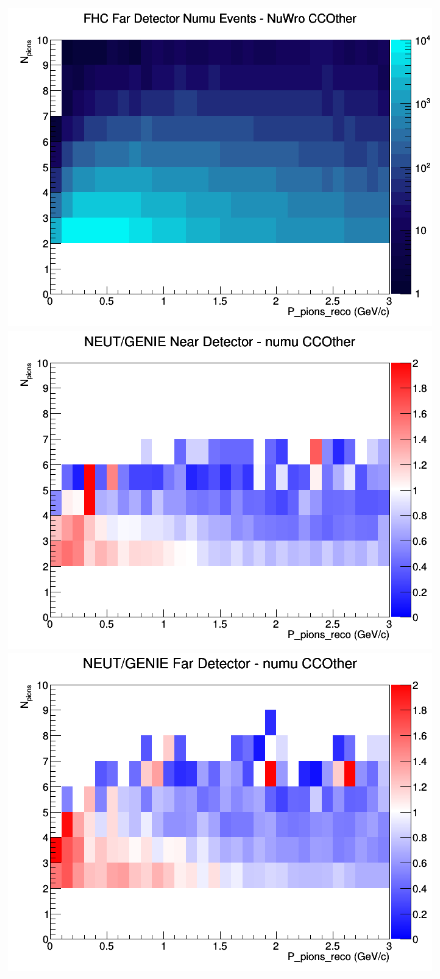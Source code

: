 \documentclass[12pt]{article}
\begin{document}
\begin{figure}[h]
\endminipage
{}
\includegraphics[width=\linewidth]{eff_N_P/FGT/pions/CCOther_FHC_FD_numu_N_P_NuWro.png}
\endminipage
\newline
{}
\includegraphics[width=\linewidth]{eff_N_P/FGT/pions/ratios/CCOther_NEUT_GENIE_numu_near_N_P.png}
\endminipage
{}
\includegraphics[width=\linewidth]{eff_N_P/FGT/pions/ratios/CCOther_NEUT_GENIE_numu_far_N_P.png}

\end{figure}
\end{document}

